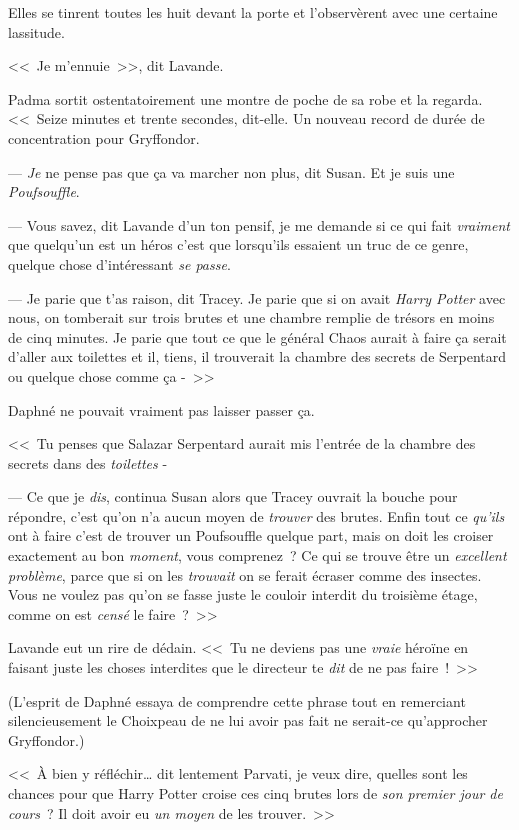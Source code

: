 Elles se tinrent toutes les huit devant la porte et l'observèrent avec une certaine lassitude.

<<~Je m'ennuie~>>, dit Lavande.

Padma sortit ostentatoirement une montre de poche de sa robe et la regarda. <<~Seize minutes et trente secondes, dit-elle. Un nouveau record de durée de concentration pour Gryffondor.

--- \emph{Je} ne pense pas que ça va marcher non plus, dit Susan. Et je suis une \emph{Poufsouffle}.

--- Vous savez, dit Lavande d'un ton pensif, je me demande si ce qui fait \emph{vraiment} que quelqu'un est un héros c'est que lorsqu'ils essaient un truc de ce genre, quelque chose d'intéressant \emph{se passe}.

--- Je parie que t'as raison, dit Tracey. Je parie que si on avait \emph{Harry Potter} avec nous, on tomberait sur trois brutes et une chambre remplie de trésors en moins de cinq minutes. Je parie que tout ce que le général Chaos aurait à faire ça serait d'aller aux toilettes et il, tiens, il trouverait la chambre des secrets de Serpentard ou quelque chose comme ça -~>>

Daphné ne pouvait vraiment pas laisser passer ça.

<<~Tu penses que Salazar Serpentard aurait mis l'entrée de la chambre des secrets dans des \emph{toilettes} -

--- Ce que je \emph{dis}, continua Susan alors que Tracey ouvrait la bouche pour répondre, c'est qu'on n'a aucun moyen de \emph{trouver} des brutes. Enfin tout ce \emph{qu'ils} ont à faire c'est de trouver un Poufsouffle quelque part, mais on doit les croiser exactement au bon \emph{moment}, vous comprenez~? Ce qui se trouve être un \emph{excellent problème}, parce que si on les \emph{trouvait} on se ferait écraser comme des insectes. Vous ne voulez pas qu'on se fasse juste le couloir interdit du troisième étage, comme on est \emph{censé} le faire~?~>>

Lavande eut un rire de dédain. <<~Tu ne deviens pas une \emph{vraie} héroïne en faisant juste les choses interdites que le directeur te \emph{dit} de ne pas faire~!~>>

(L'esprit de Daphné essaya de comprendre cette phrase tout en remerciant silencieusement le Choixpeau de ne lui avoir pas fait ne serait-ce qu'approcher Gryffondor.)

<<~À bien y réfléchir… dit lentement Parvati, je veux dire, quelles sont les chances pour que Harry Potter croise ces cinq brutes lors de \emph{son premier jour de cours}~? Il doit avoir eu \emph{un moyen} de les trouver.~>>


